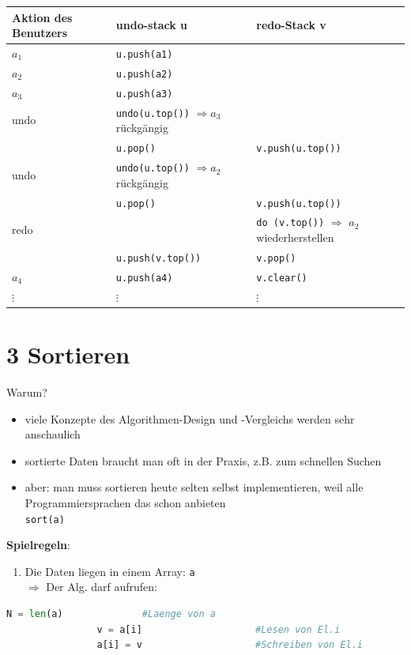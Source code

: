 \documentclass[11pt, fleqn]{scrreprt}
\begin{document}
		\begin{tabular}{C{5cm} | C{5cm} | C{5cm}}
			Aktion des Benutzers & undo-stack u & redo-Stack v \\ \hline
			$a_1$ & \verb|u.push(a1)| & \\
			$a_2$ & \verb|u.push(a2)| & \\
			$a_3$ & \verb|u.push(a3)| & \\ \hline
			undo & \verb|undo(u.top())| $\Rightarrow a_3$ rückgängig & \\ 
			& \verb|u.pop()| & \verb|v.push(u.top())|\\ \hline
			undo & \verb|undo(u.top())| $\Rightarrow a_2$ rückgängig & \\ 
			& \verb|u.pop()| & \verb|v.push(u.top())|\\ \hline
			redo & & \verb|do (v.top())| $\Rightarrow$ $a_2$ wiederherstellen \\
			& \verb|u.push(v.top())| & \verb|v.pop()| \\ \hline
			$a_4$ & \verb|u.push(a4)| & \verb|v.clear()| \\
			$\vdots$ & $\vdots$ & $\vdots$ \\
		\end{tabular}
		
		
		\chapter*{3 Sortieren}
		
		Warum?
		\begin{itemize}
			\item viele Konzepte des Algorithmen-Design und -Vergleichs werden sehr anschaulich
			\item sortierte Daten braucht man oft in der Praxis, z.B. zum schnellen Suchen
			\item aber: man muss sortieren heute selten selbst implementieren, weil alle Programmiersprachen das schon anbieten \\
			\hspace*{1cm} \verb|sort(a)| 
		\end{itemize}
		
		\textbf{Spielregeln}: 
		\begin{enumerate}
			\item Die Daten liegen in einem Array: \verb|a| \\
			$\Rightarrow$ Der Alg. darf aufrufen: \\
		\end{enumerate}
		\vspace*{-5mm}
		\begin{lstlisting}[language=Python]
				N = len(a) 				#Laenge von a
				v = a[i]		 			#Lesen von El.i
				a[i] = v 					#Schreiben von El.i
		\end{lstlisting}
		
\end{document}
